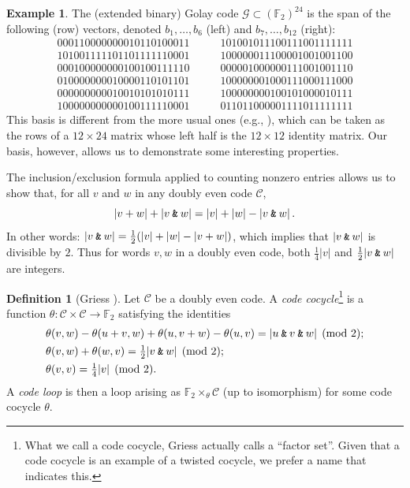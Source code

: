 \documentclass{article}
\theoremstyle{plain}
\theoremstyle{definition}
\newtheorem*{definition}{Definition}
\newtheorem{example}{Example}
\def \cC {\mathcal{C}}
\def \cG {\mathcal{G}}
\def \FF {\mathbb{F}}
\newcommand{\AND}{\mathbin{\textup{\texttt{\&}}}}
\begin{document}
\begin{example}\label{example:Golay}
The (extended binary) Golay code $\cG \subset (\FF_2)^{24}$ is the span of the following (row) vectors, denoted $b_1,\ldots,b_6$ (left) and $b_7,\ldots,b_{12}$ (right):
\[	
	 \begin{array}{c}
     000110000000010110100011 \\
     101001111101101111110001 \\
     000100000000100100111110 \\
     010000000010000110101101 \\
     000000000010010101010111 \\
     100000000000100111110001
     \end{array}
\qquad
    \begin{array}{c}
	 101001011100111001111111 \\
	 100000011100001001001100 \\
	 000001000000111001001110 \\
	 100000001000111000111000 \\
	 100000000100101000010111 \\
	 011011000001111011111111
	 \end{array}
\]
This basis is different from the more usual ones (e.g., \cite[Figure 3.4]{SPLAG}), which can be taken as the rows of a $12\times 24$ matrix whose left half is the $12\times 12$ identity matrix.
Our basis, however, allows us to demonstrate some interesting properties.
\end{example}

The inclusion/exclusion formula applied to counting nonzero entries allows us to show that, for all $v$ and $w$ in any doubly even code $\cC$,
\[
	|v+w| + |v\AND w| = |v| + |w| - |v\AND w|\,.
\]
In other words: $|v\AND w| = \frac12(|v| + |w| - |v+w|)$, which implies that $|v\AND w|$ is divisible by $2$.
Thus for words $v,w$ in a doubly even code, both $\frac14|v|$ and $\frac12|v\AND w|$ are integers.

\begin{definition}[Griess \cite{Griess}]
Let $\cC$ be a doubly even code. 
A \emph{code cocycle}\footnote{What we call a code cocycle, Griess actually calls a ``factor set''. Given that a code cocycle is an example of a twisted cocycle, we prefer a name that indicates this.} is a function $\theta\colon \cC \times \cC \to \FF_2$ satisfying the identities
\begin{align}
& \theta(v,w)-\theta(u+v,w)+\theta(u,v+w)-\theta(u,v) =|u\AND v \AND w| \pmod 2; \label{eq: code cocycle 1}\\
& \theta(v,w)+\theta(w,v) = {}  \tfrac12|v\AND w| \pmod 2; \label{eq: code cocycle 2}\\
& \theta(v,v) = {}  \tfrac14|v| \pmod 2.\label{eq: code cocycle 3}
\end{align}
A \emph{code loop} is then a loop arising as $\FF_2\times_\theta \cC$ (up to isomorphism) for some code cocycle $\theta$.
\end{definition}
\end{document}
